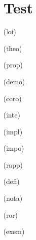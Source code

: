 \documentclass[a4paper, 10pt, garamond]{book}
\begin{document}
\chapter{Test}

\begin{tcb*}(loi){}

\end{tcb*}

\begin{tcb*}(theo){}

\end{tcb*}

\begin{tcb*}(prop){}

\end{tcb*}

\begin{tcb*}(demo){}

\end{tcb*}

\begin{tcb*}(coro){}

\end{tcb*}

\begin{tcb*}(inte){}

\end{tcb*}

\begin{tcb*}(impl){}

\end{tcb*}

\begin{tcb*}(impo){}

\end{tcb*}

\begin{tcb*}(rapp){}

\end{tcb*}

\begin{tcb*}(defi){}

\end{tcb*}

\begin{tcb*}(nota){}

\end{tcb*}

\begin{tcb*}(ror){}

\end{tcb*}

\begin{tcb*}(exem){}

\end{tcb*}
\end{document}
